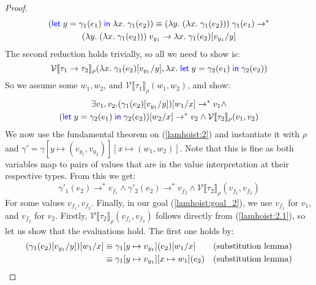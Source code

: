 \documentclass[a4paper, 11pt]{report}
\theoremstyle{definition}
\newcommand{\var}{x}
\newcommand{\varB}{y}
\newcommand{\expr}{e}
\newcommand{\val}{v}
\newcommand{\valB}{w}
\newcommand{\subst}[3]{#1{\left[#3 \middle/ #2 \right]}}
\newcommand{\Tfunc}[2]{#1 \rightarrow #2}
\newcommand{\typ}{\tau}
\newcommand{\step}{\rightarrow}
\newcommand{\stepS}{\rightarrow^*}
\newcommand{\ValInp}[2]{\mathcal{V} \llbracket #1 \rrbracket_{#2}}
\newcommand{\map}[2]{#1 \mapsto #2}
\begin{document}
\begin{proof}
  \begin{multline*}
    (\Let \varB = \gamma_1(\expr_1) in \fun \var . \gamma_1(\expr_2)) \equiv (\fun \varB . (\fun \var . \gamma_1(\expr_2))) \; \gamma_1(\expr_1) \stepS\\ (\fun \varB . (\fun \var . \gamma_1(\expr_2))) \; \val_{y_1} \step \fun \var . \subst{\gamma_1(\expr_2)}{\varB}{\val_{y_1}}
  \end{multline*}
  The second reduction holds trivially, so all we need to show is:
  \begin{equation}
    \ValInp{\Tfunc{\typ_1}{\typ_2}}{\rho}(\fun \var . \subst{\gamma_1(\expr_2)}{\varB}{\val_{y_1}}, \fun \var . \Let \varB = \gamma_2(\expr_1) in \gamma_2(\expr_2))
  \end{equation}
  So we assume some $\valB_1, \valB_2$, and $\ValInp{\typ_1}{\rho}(\valB_1, \valB_2)$, and show:
  \begin{multline}\label{lamhoist:goal_2}
    \exists \val_1, \val_2 . \subst{(\subst{\gamma_1(\expr_2)}{\varB}{\val_{y_1}})}{\var}{\valB_1} \stepS \val_1 \land\\
    \subst{(\Let \varB = \gamma_2(\expr_1) in \gamma_2(\expr_2))}{\var}{\valB_2} \stepS \val_2 \land
    \ValInp{\typ_2}{\rho}(\val_1, \val_2)
  \end{multline}
  We now use the fundamental theorem on (\ref{lamhoist:2}) and instantiate it with $\rho$ and $\gamma' = \gamma[\map{\varB}{(\val_{y_1}, \val_{y_2})}][\map{\var}{(\valB_1, \valB_2)}]$. Note that this is fine as both variables map to pairs of values that are in the value interpretation at their respective types. From this we get:
  \begin{equation}\label{lamhoist:2.1}
    \gamma'_1(\expr_2) \stepS \val_{f_1} \land \gamma'_2(\expr_2) \stepS \val_{f_2} \land \ValInp{\typ_2}{\rho}(\val_{f_1}, \val_{f_2})
  \end{equation}
  For some values $\val_{f_1}, \val_{f_2}$.
  Finally, in our goal (\ref{lamhoist:goal_2}), we use $\val_{f_1}$ for $\val_1$, and $\val_{f_2}$ for $\val_2$. Firstly, $\ValInp{\typ_2}{\rho}(\val_{f_1}, \val_{f_2})$ follows directly from (\ref{lamhoist:2.1}), so let us show that the evaluations hold. The first one holds by:
  \begin{align*}
    \subst{(\subst{\gamma_1(\expr_2)}{\varB}{\val_{y_1}})}{\var}{\valB_1}
    &\equiv
    \subst{\gamma_1[\map{\varB}{\val_{y_1}](\expr_2)}}{\var}{\valB_1} & \text{(substitution lemma)}\\
    &\equiv
    \gamma_1[\map{\varB}{\val_{y_1}}][\map{\var}{\valB_1}](\expr_2) & \text{(substitution lemma)}\\

\end{align*}
\end{proof}
\end{document}

